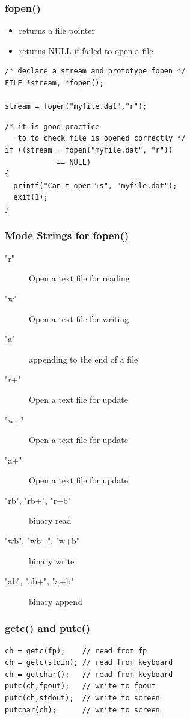 \documentclass[hyperref={xetex,colorlinks,linkcolor=blue},green,compress]{beamer}
\begin{document}
\begin{frame}[fragile]\frametitle{fopen()}
  \begin{itemize}
  \item returns a file pointer
  \item returns NULL if failed to open a file
  \end{itemize}
  \begin{small}
    \begin{exampleblock}{}
      \begin{lstlisting}
/* declare a stream and prototype fopen */
FILE *stream, *fopen();
      
stream = fopen("myfile.dat","r");
      \end{lstlisting}
    \end{exampleblock}
    \begin{exampleblock}{}
      \begin{lstlisting}
/* it is good practice
   to to check file is opened correctly */
if ((stream = fopen("myfile.dat", "r"))
            == NULL)
{            
  printf("Can't open %s", "myfile.dat");
  exit(1);
}
      \end{lstlisting}
    \end{exampleblock}
  \end{small}
\end{frame}

\begin{frame}\frametitle{Mode Strings for fopen()}
  \begin{description}
  \item["r"] Open a text file for reading
  \item["w"] Open a text file for writing
  \item["a"] appending to the end of a file
  \item["r+"] Open a text file for update
  \item["w+"] Open a text file for update
  \item["a+"] Open a text file for update
  \item["rb", "rb+", "r+b"] binary read
  \item["wb", "wb+", "w+b"] binary write
  \item["ab", "ab+", "a+b"] binary append
  \end{description}
\end{frame}

\begin{frame}[fragile]
  \frametitle{getc() and putc()}
  \begin{exampleblock}{}
    \begin{lstlisting}
ch = getc(fp);    // read from fp
ch = getc(stdin); // read from keyboard
ch = getchar();   // read from keyboard
putc(ch,fpout);   // write to fpout
putc(ch,stdout);  // write to screen
putchar(ch);      // write to screen
    \end{lstlisting}
  \end{exampleblock}
\end{frame}
\end{document}
